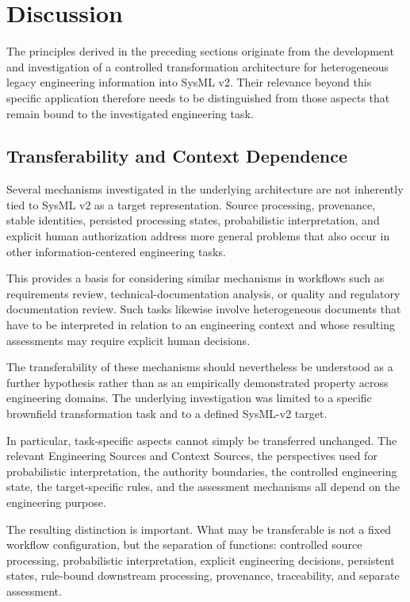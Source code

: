 \section{Discussion}
\label{sec:discussion}

The principles derived in the preceding sections originate from the development and
investigation of a controlled transformation architecture for heterogeneous legacy
engineering information into SysML v2. Their relevance beyond this specific application
therefore needs to be distinguished from those aspects that remain bound to the investigated
engineering task.

\subsection{Transferability and Context Dependence}
\label{sec:discussion_transferability}

Several mechanisms investigated in the underlying architecture are not inherently tied to
SysML v2 as a target representation. Source processing, provenance, stable identities,
persisted processing states, probabilistic interpretation, and explicit human authorization
address more general problems that also occur in other information-centered engineering
tasks.

This provides a basis for considering similar mechanisms in workflows such as requirements
review, technical-documentation analysis, or quality and regulatory documentation review.
Such tasks likewise involve heterogeneous documents that have to be interpreted in relation
to an engineering context and whose resulting assessments may require explicit human
decisions.

The transferability of these mechanisms should nevertheless be understood as a further
hypothesis rather than as an empirically demonstrated property across engineering domains.
The underlying investigation was limited to a specific brownfield transformation task and
to a defined SysML-v2 target.

In particular, task-specific aspects cannot simply be transferred unchanged. The relevant
Engineering Sources and Context Sources, the perspectives used for probabilistic
interpretation, the authority boundaries, the controlled engineering state, the
target-specific rules, and the assessment mechanisms all depend on the engineering
purpose.

The resulting distinction is important. What may be transferable is not a fixed workflow
configuration, but the separation of functions: controlled source processing,
probabilistic interpretation, explicit engineering decisions, persistent states,
rule-bound downstream processing, provenance, traceability, and separate assessment.

